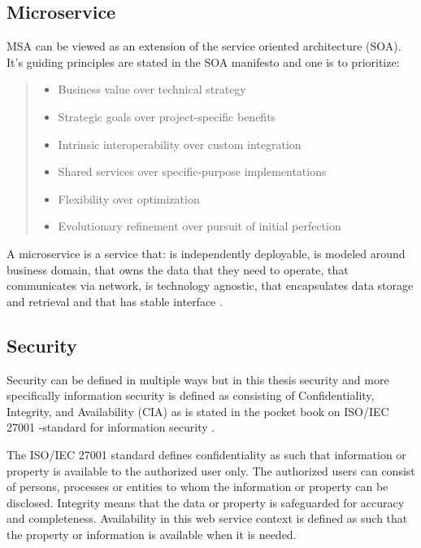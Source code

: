 \begin{sloppypar}
\subsection{Microservice}
\begin{sloppypar}
    MSA can be viewed as an extension of the service oriented 
    architecture (SOA)\citep{newman2019,fowlerlewisms}. It's guiding principles are stated in the SOA manifesto 
    \citep{soamanifesto} and one is to prioritize:
    \begin{quotation}
        \noindent \it
        \begin{itemize}
            \item Business value over technical strategy
            \item Strategic goals over project-specific benefits 
            \item Intrinsic interoperability over custom integration 
            \item Shared services over specific-purpose implementations 
            \item Flexibility over optimization 
            \item Evolutionary refinement over pursuit of initial perfection
        \end{itemize}
    \end{quotation}
\end{sloppypar}
\begin{sloppypar}
    A microservice is a service that: is independently deployable,
    is modeled around business domain,
    that owns the data that they need to operate,
    that communicates via network,
    is technology agnostic,
    that encapsulates data storage and retrieval and 
    that has stable interface \citep{newman2019}.
\end{sloppypar}

\subsection{Security}
\begin{sloppypar}
    Security can be defined in multiple ways but in this thesis security 
    and more specifically information security is defined as consisting of 
    Confidentiality, Integrity, and Availability (CIA) as is stated in the 
    pocket book on ISO/IEC 27001 -standard for information security \citep{isoiec27001}.
\end{sloppypar}
\begin{sloppypar}
    The ISO/IEC 27001 standard defines confidentiality as such that information 
    or property is available to the authorized user only. The authorized users 
    can consist of persons, processes or entities to whom the information or 
    property can be disclosed. Integrity means that the data or property is 
    safeguarded for accuracy and completeness. Availability in this web service
    context is defined as such that the property or information is available 
    when it is needed.
\end{sloppypar}



\end{sloppypar}
